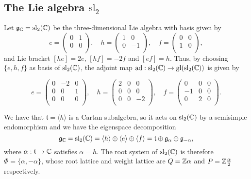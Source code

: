 \subsection{The Lie algebra $\mathrm{sl}_2$}

Let $\mathfrak{g}_{\mathbb{C}}=\mathrm{sl}_2(\mathbb{C})$ be the three-dimensional Lie algebra with basis given by
$$e=\begin{pmatrix}
    0 & 1\\
    0 & 0\\
\end{pmatrix},\quad h=\begin{pmatrix}
    1 & 0\\
    0 & -1\\
\end{pmatrix},\quad f=\begin{pmatrix}
    0 & 0\\
    1 & 0\\
\end{pmatrix},$$
and Lie bracket $[he]=2e$, $[hf]=-2f$ and $[ef]=h$. Thus, by choosing $\{e,h,f\}$ as basis of $\mathrm{sl}_2(\mathbb{C})$, the adjoint map $\mathrm{ad}:\mathrm{sl}_2(\mathbb{C})\to\mathrm{gl}(\mathrm{sl}_2(\mathbb{C}))$ is given by 

$$e=\begin{pmatrix}
    0 & -2 & 0\\
    0 & 0 & 1\\
    0 & 0 & 0\\
\end{pmatrix},\quad h=\begin{pmatrix}
    2 & 0 & 0\\
    0 & 0 & 0\\
    0 & 0 & -2\\
\end{pmatrix},\quad f=\begin{pmatrix}
    0 & 0 & 0\\
    -1 & 0 & 0\\
    0 & 2 & 0\\
\end{pmatrix}.$$

We have that $\mathfrak{t}=\langle h\rangle$ is a Cartan subalgebra, so it acts on $\mathrm{sl}_2(\mathbb{C})$ by a semisimple endomorphism and we have the eigenspace decomposition 
$$\mathfrak{g}_{\mathbb{C}}=\mathrm{sl}_2(\mathbb{C})=\langle h\rangle\oplus\langle e\rangle\oplus\langle f\rangle=\mathfrak{t}\oplus\mathfrak{g}_\alpha\oplus\mathfrak{g}_{-\alpha},$$
where $\alpha:\mathfrak{t}\to\mathbb{C}$ satisfies $\alpha=h$. The root system of $\mathrm{sl}_2(\mathbb{C})$ is therefore $\Phi=\{\alpha,-\alpha\}$, whose root lattice and weight lattice are $Q=\mathbb{Z}\alpha$ and $P=\mathbb{Z}\frac{\alpha}{2}$ respectively.

